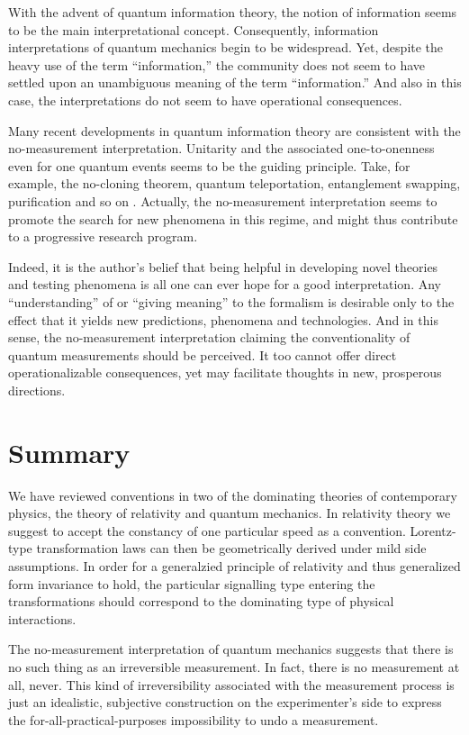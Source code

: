With the advent of quantum information theory, the notion of information
seems to be the main interpretational concept.
Consequently, information interpretations of quantum mechanics begin to
be widespread.
Yet, despite the heavy use of the term ``information,''
the community does not seem to have
settled upon an unambiguous meaning of the term
``information.''
And also in this case, the interpretations do
not seem to have operational consequences.

Many recent developments in quantum information theory
are consistent
with the no-measurement interpretation.
Unitarity and the associated
one-to-onenness even for one
quantum events seems to be the guiding principle.
Take, for example, the no-cloning theorem, quantum teleportation,
entanglement swapping,  purification and so on
\cite{Gruska,Nielsen-book}.
Actually, the no-measurement interpretation seems to promote the
search for new phenomena in this regime, and might thus contribute to
a progressive research program.

Indeed, it is the author's belief  that being helpful in developing
novel theories and testing
phenomena is all one can ever hope for a good interpretation.
Any ``understanding'' of or ``giving meaning'' to
the formalism is desirable only
to the effect that it yields new predictions, phenomena
and technologies.
And in this sense,
the no-measurement interpretation claiming the
conventionality of quantum measurements
should be perceived.
It too cannot offer direct operationalizable consequences,
yet may facilitate thoughts in new, prosperous directions.


\section{Summary}
We have reviewed conventions in two of the dominating theories of
contemporary physics, the theory of relativity and quantum mechanics.
In relativity theory we suggest to accept the constancy of one
particular speed as a convention.
Lorentz-type transformation laws can then be geometrically
derived under mild side assumptions.
In order for a generalzied
principle of relativity and thus generalized form invariance to hold,
the particular signalling type entering the transformations
should correspond to the
dominating type of physical interactions.

The
no-measurement interpretation of quantum mechanics  suggests that there
is no such thing
as an irreversible measurement. In fact, there is no measurement at all,
never.
This kind of irreversibility
associated with the measurement
process is just an idealistic, subjective construction on the
experimenter's side to express the
for-all-practical-purposes impossibility to undo a measurement.



